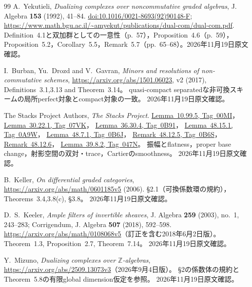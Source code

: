 \documentclass[11pt,a4paper]{ltjsarticle}
\numberwithin{equation}{section}
\begin{document}
\begin{thebibliography}{99}
A.~Yekutieli,
\emph{Dualizing complexes over noncommutative graded algebras},
J. Algebra \textbf{153} (1992), 41--84.
\href{https://doi.org/10.1016/0021-8693(92)90148-F}{doi:10.1016/0021-8693(92)90148-F};
\url{https://www.math.bgu.ac.il/~amyekut/publications/dual-com/dual-com.pdf}.
Definition~4.1と双加群としての一意性（p.~57），Proposition~4.6（p.~59），
Proposition~5.2，Corollary~5.5，Remark~5.7（pp.~65--68）。2026年11月19日原文確認。

I.~Burban, Yu.~Drozd and V.~Gavran,
\emph{Minors and resolutions of non-commutative schemes},
\url{https://arxiv.org/abs/1501.06023}, v2 (2017),
Definitions~3.1,3.13 and Theorem~3.14。
quasi-compact separatedな非可換スキームの局所perfect対象とcompact対象の一致。
2026年11月19日原文確認。

The Stacks Project Authors, \emph{The Stacks Project}.
\href{https://stacks.math.columbia.edu/tag/00MI}{Lemma~10.99.5, Tag~00MI}，
\href{https://stacks.math.columbia.edu/tag/07VK}{Lemma~30.22.1, Tag~07VK}，
\href{https://stacks.math.columbia.edu/tag/0B91}{Lemma~36.30.4, Tag~0B91}，
\href{https://stacks.math.columbia.edu/tag/0A9W}{Lemma~48.15.1, Tag~0A9W}，
\href{https://stacks.math.columbia.edu/tag/0B6J}{Lemma~48.7.1, Tag~0B6J}，
\href{https://stacks.math.columbia.edu/tag/0B6S}{Remark~48.12.5, Tag~0B6S}，
\href{https://stacks.math.columbia.edu/tag/0E4H}{Remark~48.12.6}，
\href{https://stacks.math.columbia.edu/tag/047N}{Lemma~39.8.2, Tag~047N}。
振幅とflatness，proper base change，射影空間の双対・trace，Cartierのsmoothness。
2026年11月19日原文確認。

B.~Keller, \emph{On differential graded categories},
\url{https://arxiv.org/abs/math/0601185v5} (2006).
\S2.1（可換係数環の規約），Theorems~3.4,3.8(c), \S3.8。
2026年11月19日原文確認。

D.~S.~Keeler, \emph{Ample filters of invertible sheaves},
J. Algebra \textbf{259} (2003), no.~1, 243--283;
Corrigendum, J. Algebra \textbf{507} (2018), 592--598.
\url{https://arxiv.org/abs/math/0108068v5}（訂正を含む2018年6月2日版）。
Theorem~1.3, Proposition~2.7, Theorem~7.14。
2026年11月19日原文確認。

Y.~Mizuno, \emph{Dualizing complexes over $\mathbb Z$-algebras},
\url{https://arxiv.org/abs/2509.13073v3}（2026年9月4日版）。
\S2の係数体の規約とTheorem~5.8の有限global dimension仮定を参照。
2026年11月19日原文確認。


\end{thebibliography}
\end{document}
